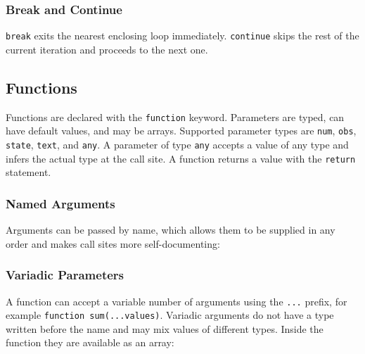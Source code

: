

\subsubsection{Break and Continue}

\texttt{break} exits the nearest enclosing loop immediately.
\texttt{continue} skips the rest of the current iteration and proceeds to
the next one.




\newpage
\subsection{Functions}\label{sec:functions}

Functions are declared with the \texttt{function} keyword. Parameters are
typed, can have default values, and may be arrays. Supported parameter types
are \texttt{num}, \texttt{obs}, \texttt{state}, \texttt{text}, and
\texttt{any}. A parameter of type \texttt{any} accepts a value of any type
and infers the actual type at the call site. A function returns a value
with the \texttt{return} statement.



\newpage
\subsubsection{Named Arguments}

Arguments can be passed by name, which allows them to be supplied in any
order and makes call sites more self-documenting:



\subsubsection{Variadic Parameters}

A function can accept a variable number of arguments using the \texttt{...}
prefix, for example \texttt{function sum(...values)}. Variadic arguments do
not have a type written before the name and may mix values of different
types. Inside the function they are available as an array:



